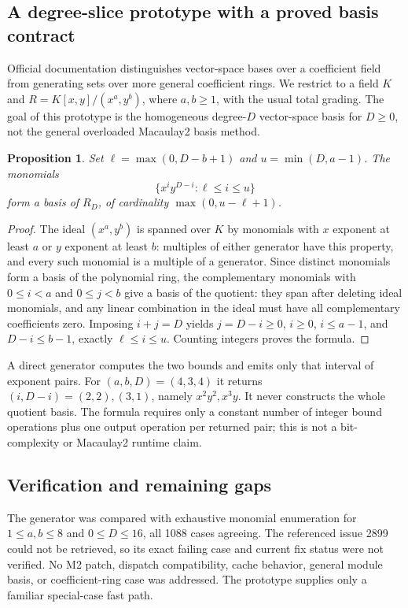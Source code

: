 \documentclass[11pt]{article}
\newtheorem{proposition}{Proposition}
\begin{document}
\subsection{A degree-slice prototype with a proved basis contract}
Official documentation distinguishes vector-space bases over a coefficient field from generating sets over more general coefficient rings. We restrict to a field $K$ and $R=K[x,y]/(x^a,y^b)$, where $a,b\ge1$, with the usual total grading. The goal of this prototype is the homogeneous degree-$D$ vector-space basis for $D\ge0$, not the general overloaded Macaulay2 basis method.
\begin{proposition}
Set $\ell=\max(0,D-b+1)$ and $u=\min(D,a-1)$. The monomials
\[
\{x^i y^{D-i}:\ell\le i\le u\}
\]
form a basis of $R_D$, of cardinality $\max(0,u-\ell+1)$.
\end{proposition}
\begin{proof}
The ideal $(x^a,y^b)$ is spanned over $K$ by monomials with $x$ exponent at least $a$ or $y$ exponent at least $b$: multiples of either generator have this property, and every such monomial is a multiple of a generator. Since distinct monomials form a basis of the polynomial ring, the complementary monomials with $0\le i<a$ and $0\le j<b$ give a basis of the quotient: they span after deleting ideal monomials, and any linear combination in the ideal must have all complementary coefficients zero. Imposing $i+j=D$ yields $j=D-i\ge0$, $i\ge0$, $i\le a-1$, and $D-i\le b-1$, exactly $\ell\le i\le u$. Counting integers proves the formula.
\end{proof}
A direct generator computes the two bounds and emits only that interval of exponent pairs. For $(a,b,D)=(4,3,4)$ it returns $(i,D-i)=(2,2),(3,1)$, namely $x^2y^2,x^3y$. It never constructs the whole quotient basis. The formula requires only a constant number of integer bound operations plus one output operation per returned pair; this is not a bit-complexity or Macaulay2 runtime claim.
\subsection{Verification and remaining gaps}
The generator was compared with exhaustive monomial enumeration for $1\le a,b\le8$ and $0\le D\le16$, all 1088 cases agreeing. The referenced issue 2899 could not be retrieved, so its exact failing case and current fix status were not verified. No M2 patch, dispatch compatibility, cache behavior, general module basis, or coefficient-ring case was addressed. The prototype supplies only a familiar special-case fast path.
\end{document}

